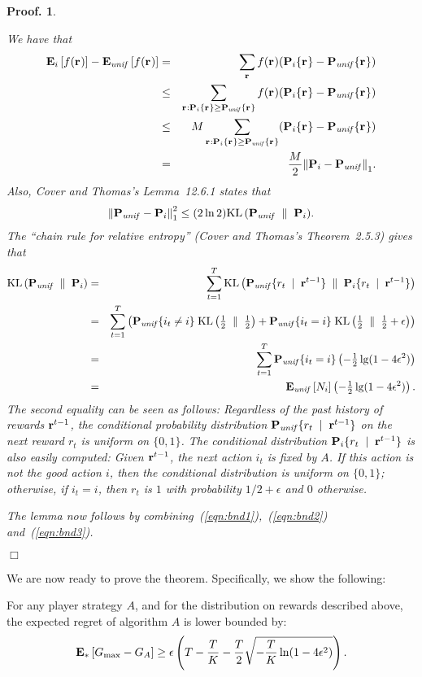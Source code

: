 \documentclass[12pt]{article}
\newcommand{\paren}[1]{\left({#1}\right)}
\renewcommand{\i}[1]{i_{#1}}
\newcommand{\Gactbest}{G_{\rm max}}
\newtheorem{pproof}{Proof.}
\newenvironment{proof}{
\begin{pproof}
        \begin{rm}\begin{rm}}{
        \hspace*{\fill} $\Box$
        \end{rm}\end{rm}
        \end{pproof}
}
\newcommand{\distcom}[2]{#1 \{#2\}}
\newcommand{\Pud}{{\bf P}_{\it unif}}
\newcommand{\Peid}{{\bf P}_{i}}
\newcommand{\Pu}[1]{\distcom{\Pud}{#1}} %
\newcommand{\Pei}[1]{\distcom{\Peid}{#1}}%
\newcommand{\Eu}[1]{{\bf E}_{\it unif} \left[#1\right]}
\newcommand{\Ee}[1]{{\bf E}_{*} \left[#1\right]}
\newcommand{\Ei}[1]{{\bf E}_{i} \left[#1\right]}
\renewcommand{\r}[1]{{r_{#1}}}
\newcommand{\rvec}[1]{{{\bf r}^{#1}}}
\newcommand{\rv}{\rvec{}}
\newcommand{\given}{\;\mid\;}
\newcommand{\numai}{{N_i}}
\newcommand{\lneps}{\ln(1-4\epsilon^2)}
\newcommand{\lgeps}{\lg(1-4\epsilon^2)}
\newcommand{\vardist}[2]{{\left\|{#1}-{#2}\right\|_1}}
\newcommand{\vardistsq}[2]{{\left\|{#1}-{#2}\right\|^2_1}}
\newcommand{\kldist}[2]{{{\rm KL}\paren{{#1} \;\parallel\; {#2}}}}
\newcommand{\sfrac}[2]{\mbox{$\frac{#1}{#2}$}}
\begin{document}
\begin{proof}
We have that
\begin{eqnarray}
\Ei{f(\rv)} - \Eu{f(\rv)}
  &=&
\sum_{\rv} f(\rv) (\Pei{\rv} - \Pu{\rv}) \nonumber \\
 &\leq&
\sum_{\rv: \Pei{\rv}\geq \Pu{\rv}} f(\rv) (\Pei{\rv} - \Pu{\rv}) \nonumber \\
 &\leq&
M \sum_{\rv: \Pei{\rv}\geq \Pu{\rv}} (\Pei{\rv} - \Pu{\rv}) \nonumber \\
&=&
\frac{M}{2} \vardist{\Peid}{\Pud}.
 \label{eqn:bnd1}
\end{eqnarray}
Also, Cover and Thomas's Lemma~12.6.1 states that
\begin{equation} \label{eqn:bnd2}
\vardistsq{\Pud}{\Peid} \leq (2\ln 2) \kldist{\Pud}{\Peid}.
\end{equation}
The ``chain rule for relative entropy'' (Cover and Thomas's
Theorem~2.5.3) gives that
\begin{eqnarray}
\kldist{\Pud}{\Peid} &=& \sum_{t=1}^T
       \kldist{ \Pu{\r{t} \given \rvec{t-1}}}{ \Pei{\r{t} \given \rvec{t-1}}}
                       \nonumber \\
   &=& \sum_{t=1}^T \paren{\Pu{\i{t} \neq i}\; \kldist{\sfrac{1}{2}}{\sfrac{1}{2}} + 
                    \Pu{\i{t} = i}\; \kldist{\sfrac{1}{2}}{\sfrac{1}{2}+\epsilon}}
                       \nonumber \\
   &=& \sum_{t=1}^T \Pu{\i{t} = i} \paren{-\sfrac{1}{2}\lgeps}
                       \nonumber \\
   &=& \Eu{\numai}  \paren{-\sfrac{1}{2}\lgeps}.
                 \label{eqn:bnd3}
\end{eqnarray}
The second equality can be seen as follows:
Regardless of the past history of rewards
$\rvec{t-1}$, the conditional probability
distribution $\Pu{\r{t} \given \rvec{t-1}}$
on the next reward $\r{t}$ is uniform on $\{0,1\}$.
The conditional distribution $\Pei{\r{t} \given \rvec{t-1}}$ is also
easily computed:
Given $\rvec{t-1}$, the next action $\i{t}$ is fixed
by $A$.
If this action is not the good action $i$, then the
conditional distribution is uniform on $\{0,1\}$; otherwise,
if $\i{t}=i$, then $\r{t}$ is $1$ with probability $1/2+\epsilon$ and
$0$ otherwise.

The lemma now follows by combining~(\ref{eqn:bnd1}),~(\ref{eqn:bnd2})
and~(\ref{eqn:bnd3}).
\end{proof}
%
We are now ready to prove the theorem.
Specifically, we show the following:
%
\begin{theorem} \label{thm:lowbnd}
For any player strategy $A$, and for the distribution on rewards
described above, the expected regret of algorithm $A$ is lower bounded
by:
\[
\Ee{\Gactbest - G_A} \geq
\epsilon\paren{T-\frac{T}{K} - \frac{T}{2}\sqrt{-\frac{T}{K}\lneps}}.
\]
\end{theorem}
\end{document}
